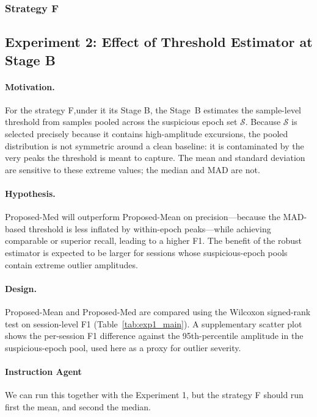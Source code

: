 \subsubsection{Strategy F}



\subsection{Experiment 2: Effect of Threshold Estimator at Stage B}
\label{sec:exp4}

\paragraph{Motivation.}
For the strategy F,under it its Stage B, the Stage~B estimates the sample-level threshold from samples pooled across the
suspicious epoch set $\mathcal{S}$.
Because $\mathcal{S}$ is selected precisely because it contains high-amplitude
excursions, the pooled distribution is not symmetric around a clean baseline:
it is contaminated by the very peaks the threshold is meant to capture.
The mean and standard deviation are sensitive to these extreme values; the median
and MAD are not.

\paragraph{Hypothesis.}
Proposed-Med will outperform Proposed-Mean on precision---because the MAD-based
threshold is less inflated by within-epoch peaks---while achieving comparable or
superior recall, leading to a higher F1.
The benefit of the robust estimator is expected to be larger for sessions whose
suspicious-epoch pools contain extreme outlier amplitudes.

\paragraph{Design.}
Proposed-Mean and Proposed-Med are compared using the Wilcoxon signed-rank test
on session-level F1 (Table~\ref{tab:exp1_main}).
A supplementary scatter plot shows the per-session F1 difference against the
95th-percentile amplitude in the suspicious-epoch pool,
used here as a proxy for outlier severity.
\paragraph{Instruction Agent}
We can run this together with the Experiment 1, but the strategy F should run first the mean, and second the median.

